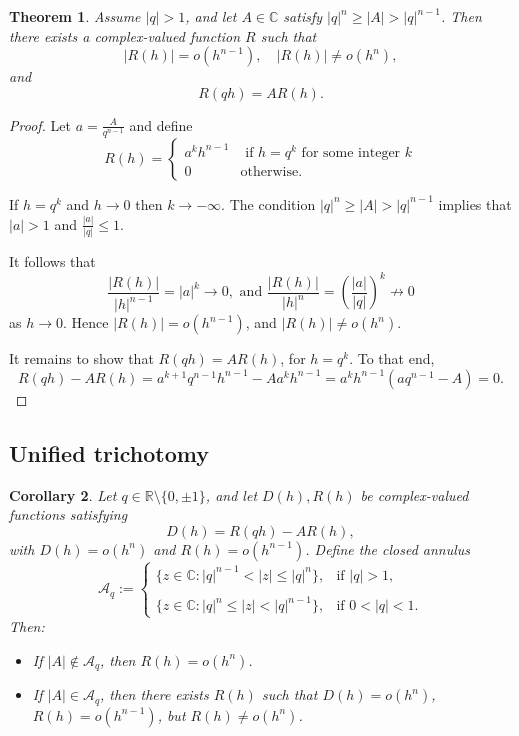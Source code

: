 \documentclass{raex}
\newtheorem{theorem}{Theorem}
\newtheorem{corollary}[theorem]{Corollary}
\theoremstyle{definition}
\begin{document}
\begin{theorem}\label{th3}
Assume \( |q| > 1 \), and let \( A \in \mathbb{C} \) satisfy \( |q|^n \geq |A| > |q|^{n-1} \). Then there exists a complex-valued function \( R\) such that
\[
|R(h)| = o(h^{n-1}), \quad |R(h)| \not= o(h^n),
\]
and
\[
R(qh) = A R( h).
\]
\end{theorem}
 \begin{proof}
 Let $a=\frac{A}{q^{n-1}}$ and define $$R(h)=\left\{ \begin{array}{cc} a^kh^{n-1} & \text{ if } h=q^k \text{ for some integer $k$} \\  0 & \text {otherwise.}\end{array}\right.$$
 
 If $h=q^k$ and  $h\to 0$ then $k\to -\infty$. The condition $|q|^{n}\geq |A|>|q|^{n-1}$ implies that $|a|>1$ and $\frac{|a|}{|q|}\leq 1$. 
 
 It follows that  $$\frac{|R(h)|}{|h|^{n-1}}=|a|^k\to 0, \text{ and }\frac{|R(h)|}{|h|^{n}}=\left(\frac{|a|}{|q|}\right)^k\not \to 0$$ as $h\to 0$.   Hence $|R(h)|=o(h^{n-1})$, and $|R(h)|\neq o(h^n)$. 
 
It remains to show that $R(qh)=AR(h)$, for $h=q^k$. To that end, $$R(qh)-AR(h)=a^{k+1}q^{n-1}h^{n-1}-Aa^{k}h^{n-1}= a^{k}h^{n-1}(aq^{n-1}-A)=0.$$ 
 \end{proof}


\subsection{Unified trichotomy}

\begin{corollary}\label{cor:trichotomy}
Let \( q \in \mathbb{R} \setminus \{0, \pm1\} \), and let \( D(h), R(h) \) be complex-valued functions satisfying
\[
D(h) = R(qh) - A R(h),
\]
with \( D(h) = o(h^n) \) and \( R(h) = o(h^{n-1}) \). Define the closed annulus
\[
\mathcal{A}_q := 
\begin{cases}
\{ z \in \mathbb{C} : |q|^{n-1} < |z| \leq |q|^n \}, & \text{if } |q| > 1, \\\\
\{ z \in \mathbb{C} : |q|^n \leq |z| < |q|^{n-1} \}, & \text{if } 0 < |q| < 1.
\end{cases}
\]
Then:
\begin{itemize}
  \item If \( |A| \notin \mathcal{A}_q \), then \( R(h) = o(h^n) \).
  \item If \( |A| \in \mathcal{A}_q \), then there exists \( R(h) \) such that \( D(h) = o(h^n) \), \( R(h) = o(h^{n-1}) \), but \( R(h) \not= o(h^n) \).
\end{itemize}
\end{corollary}
\end{document}
